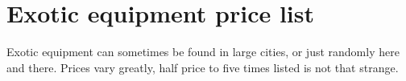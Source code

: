 \normalsize









\goodbreak {}
\section*{Exotic equipment price list}

Exotic equipment can sometimes be found in large cities, or just randomly here and there. Prices vary greatly, half price to five times listed is not that strange.

